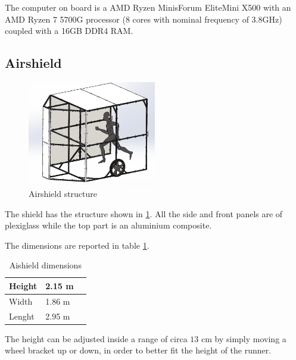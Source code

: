 \documentclass[a4paper,12pt,oneside]{book}
\begin{document}
\bigskip
The computer on board is a AMD Ryzen MinisForum EliteMini X500 with an AMD Ryzen 7 5700G processor (8 cores with nominal frequency of 3.8GHz) coupled with a 16GB DDR4 RAM.

\subsection{Airshield}

\begin{figure}
	\centering
	\includegraphics[width=0.5\textwidth]{Shield_structure.png}
\caption{Airshield structure}
\label{Shield_structure}
\end{figure}

The shield has the structure shown in \ref{Shield_structure}.
All the side and front panels are of plexiglass while the top part is an aluminium composite.

The dimensions are reported in table \ref{tab:Shield_dimensions}.

\begin{table}[h]
\centering
\begin{tabular}{|p{1.5cm}|p{1.5cm}|p{1.5cm}|}
\hline
Height & 2.15 m \\
\hline
Width & 1.86 m \\
\hline
Lenght & 2.95 m \\
\hline
\end{tabular}
\caption{Aishield dimensions}
\label{tab:Shield_dimensions}
\end{table}
The height can be adjusted inside a range of circa $13$ cm by simply moving a wheel bracket up or down, in order to better fit the height of the runner.
\end{document}
